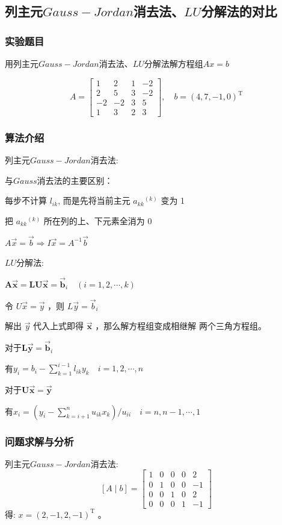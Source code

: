 \documentclass[UTF8]{ctexart}
\begin{document}
\subsection{列主元$Gauss-Jordan$消去法、$LU$分解法的对比}
\subsubsection{实验题目}
用列主元$Gauss-Jordan$消去法、$LU$分解法解方程组$Ax = b$

$$
  A=\left[\begin{array}{cccc}
      1 & 2 & 1 & -2 \\
      2 & 5 & 3 & -2 \\
      -2 & -2 & 3 & 5 \\
      1 & 3 & 2 & 3
  \end{array}\right], \quad b=(4,7,-1,0)^{\mathrm{T}}
$$
\subsubsection{算法介绍}
列主元$Gauss-Jordan$消去法:

与$Gauss$消去法的主要区别：

每步不计算 $l_{i k}$, 而是先将当前主元 $a_{k k}{ }^{(k)}$ 变为 1

把 $a_{k k}{ }^{(k)}$ 所在列的上、下元素全消为 0

$A \vec{x}=\vec{b} \Rightarrow I \vec{x}=A^{-1} \vec{b}$

\quad

$LU$分解法:

$\boldsymbol{A} \overrightarrow{\boldsymbol{x}}=\boldsymbol{L} \boldsymbol{U} \overrightarrow{\boldsymbol{x}}=\overrightarrow{\boldsymbol{b}}_{i} \quad(i=1,2, \cdots, k)$

令 $U \vec{x}=\vec{y}$ ，则 $L \vec{y}=\vec{b}_{i}$

解出 $\vec{y}$ 代入上式即得 $\overrightarrow{\boldsymbol{x}}$ ，那么解方程组变成相继解 两个三角方程组。

对于$\boldsymbol{L} \overrightarrow{\boldsymbol{y}}=\overrightarrow{\boldsymbol{b}}_{i}$

有$y_{i}=b_{i}-\sum_{k=1}^{i-1} l_{i k} y_{k} \quad i=1,2, \cdots, n$

对于$\boldsymbol{U} \overrightarrow{\boldsymbol{x}}=\overrightarrow{\boldsymbol{y}}$

有$x_{i}=\left(y_{i}-\sum_{k=i+1}^{n} u_{i k} x_{k}\right) / u_{i i} \quad i=n, n-1, \cdots, 1$

\subsubsection{问题求解与分析}
列主元$Gauss-Jordan$消去法:
$$
  [A \mid b]=\left[\begin{array}{ccccc}
      1 & 0 & 0 & 0 & 2 \\
      0 & 1 & 0 & 0 & -1 \\
      0 & 0 & 1 & 0 & 2 \\
      0 & 0 & 0 & 1 & -1
      \end{array}\right]
$$
得:  $x=(2,-1,2,-1)^{\mathrm{T}}$ 。
\end{document}

